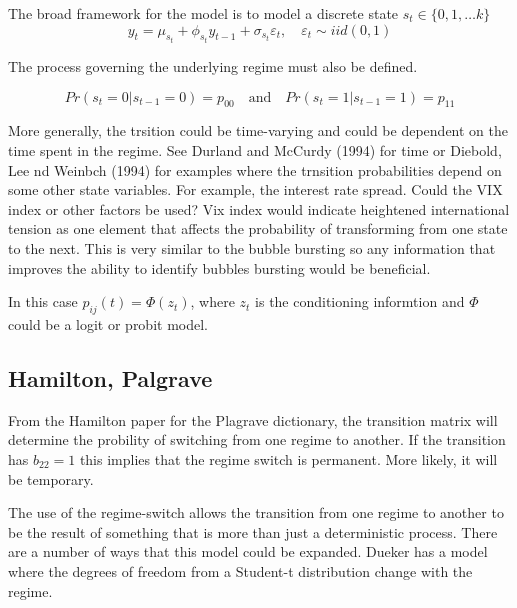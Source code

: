 \documentclass[12pt, a4paper, oneside]{article} %
\begin{document}
The broad framework for the model is to model a discrete state $s_t \in \{0,1,\dots k \}$
\begin{equation}
y_t = \mu_{s_t} + \phi_{s_t} y_{t-1} + \sigma_{s_t} \varepsilon_t, \quad \varepsilon_t \sim iid(0,1) 
\end{equation}

The process governing the underlying regime must also be defined. 

\begin{equation}
Pr(s_t = 0| s_{t-1} = 0) = p_{00} \quad \text{and} \quad Pr(s_t = 1| s_{t-1} = 1) = p_{11}
\end{equation}

More generally, the trsition could be time-varying and could be dependent on the time spent in the regime.  See Durland and McCurdy (1994) for time or Diebold, Lee nd Weinbch (1994) for examples where the trnsition probabilities depend on some other state variables.  For example, the interest rate spread.   Could the VIX index or other factors be used?  Vix index would indicate heightened international tension as one element that affects the probability of transforming from one state to the next.  This is very similar to the bubble bursting so any information that improves the ability to identify bubbles bursting would be beneficial.  

In this case $p_{ij}(t) = \Phi(z_t)$, where $z_t$ is the conditioning informtion and $\Phi$ could be a logit or probit model.  



\subsection{Hamilton, Palgrave}
From the Hamilton paper for the Plagrave dictionary, the transition matrix will determine the probility of switching from one regime to another.  If the transition has $b_{22} = 1$ this implies that the regime switch is permanent. More likely, it will be temporary. 
 
The use of the regime-switch allows the transition from one regime to another to be the result of something that is more than just a deterministic process. There are a number of ways that this model could be expanded.  Dueker has a model where the degrees of freedom from a Student-t distribution change with the regime.  
\end{document}
